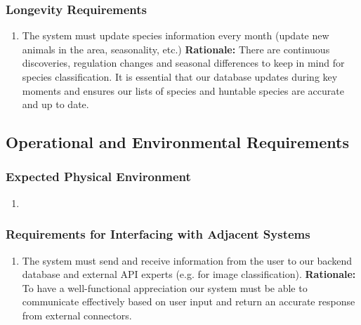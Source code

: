 \documentclass[]{article}
\begin{document}
\subsubsection{Longevity Requirements}
\label{ssub:longevity_requirements}
\begin{enumerate}[{PR-L}1. ]
	\item The system must update species information every month (update new animals in the area, seasonality, etc.)
	\textbf{Rationale:} There are continuous discoveries, regulation changes and seasonal differences to keep in mind for species classification. It is essential that our database updates during key moments and ensures our lists of species and huntable species are accurate and up to date. 
\end{enumerate}


\subsection{Operational and Environmental Requirements}
\label{sub:operational_and_environmental_requirements}

\subsubsection{Expected Physical Environment}
\label{ssub:expected_physical_environment}
\begin{enumerate}[{OE-EPE}1. ]
	\item 
\end{enumerate}

\subsubsection{Requirements for Interfacing with Adjacent Systems}
\label{ssub:requirements_for_interfacing_with_adjacent_systems}
\begin{enumerate}[{OE-IA}1. ]
	\item The system must send and receive information from the user to our backend database and external API experts (e.g. for image classification).
	\textbf{Rationale: }To have a well-functional appreciation our system must be able to communicate effectively based on user input and return an accurate response from external connectors. 
\end{enumerate}
\end{document}
